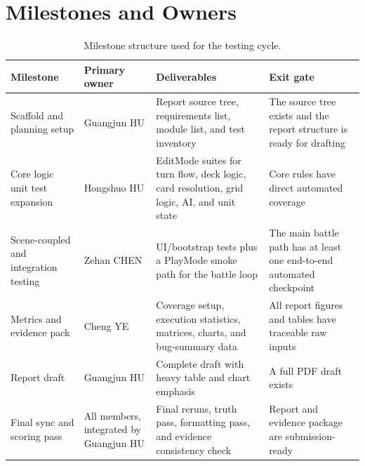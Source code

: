 \section{Milestones and Owners}

\begin{table}[H]
\centering
\small
\begin{tabular}{llll}
\toprule
\parbox[t]{2.5cm}{\textbf{Milestone}} & \parbox[t]{2.2cm}{\textbf{Primary owner}} & \parbox[t]{4.6cm}{\textbf{Deliverables}} & \parbox[t]{4.2cm}{\textbf{Exit gate}} \\
\midrule
\parbox[t]{2.5cm}{Scaffold and planning setup} & \parbox[t]{2.2cm}{Guangjun HU} & \parbox[t]{4.6cm}{Report source tree, requirements list, module list, and test inventory} & \parbox[t]{4.2cm}{The source tree exists and the report structure is ready for drafting} \\
\parbox[t]{2.5cm}{Core logic unit test expansion} & \parbox[t]{2.2cm}{Hongshuo HU} & \parbox[t]{4.6cm}{EditMode suites for turn flow, deck logic, card resolution, grid logic, AI, and unit state} & \parbox[t]{4.2cm}{Core rules have direct automated coverage} \\
\parbox[t]{2.5cm}{Scene-coupled and integration testing} & \parbox[t]{2.2cm}{Zehan CHEN} & \parbox[t]{4.6cm}{UI/bootstrap tests plus a PlayMode smoke path for the battle loop} & \parbox[t]{4.2cm}{The main battle path has at least one end-to-end automated checkpoint} \\
\parbox[t]{2.5cm}{Metrics and evidence pack} & \parbox[t]{2.2cm}{Cheng YE} & \parbox[t]{4.6cm}{Coverage setup, execution statistics, matrices, charts, and bug-summary data} & \parbox[t]{4.2cm}{All report figures and tables have traceable raw inputs} \\
\parbox[t]{2.5cm}{Report draft} & \parbox[t]{2.2cm}{Guangjun HU} & \parbox[t]{4.6cm}{Complete draft with heavy table and chart emphasis} & \parbox[t]{4.2cm}{A full PDF draft exists} \\
\parbox[t]{2.5cm}{Final sync and scoring pass} & \parbox[t]{2.2cm}{All members, integrated by Guangjun HU} & \parbox[t]{4.6cm}{Final reruns, truth pass, formatting pass, and evidence consistency check} & \parbox[t]{4.2cm}{Report and evidence package are submission-ready} \\
\bottomrule
\end{tabular}
\caption{Milestone structure used for the testing cycle.}
\label{tab:wr3-milestones}
\end{table}

